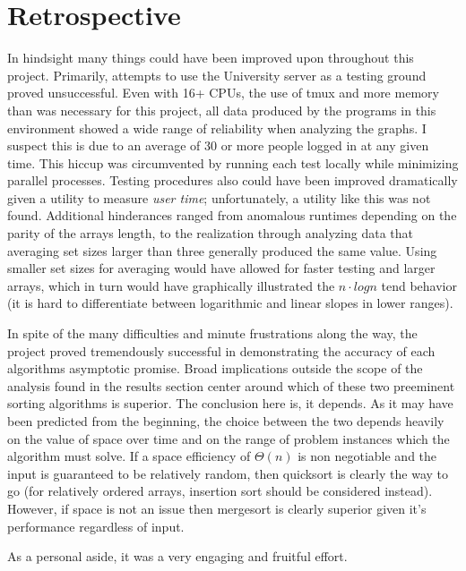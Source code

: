 \documentclass[11pt,letterpaper]{report}
\begin{document}
\section*{Retrospective} %
In hindsight many things could have been improved upon throughout this project. Primarily, attempts to use the University server as a testing ground proved unsuccessful. Even with 16+ CPUs, the use of tmux and more memory than was necessary for this project, all data produced by the programs in this environment showed a wide range of reliability when analyzing the graphs. I suspect this is due to an average of 30 or more people logged in at any given time. This hiccup was circumvented by running each test locally while minimizing parallel processes. Testing procedures also could have been improved dramatically given a utility to measure \emph{user time}; unfortunately, a utility like this was not found. Additional hinderances ranged from anomalous runtimes depending on the parity of the arrays length, to the realization through analyzing data that averaging set sizes larger than three generally produced the same value. Using smaller set sizes for averaging would have allowed for faster testing and larger arrays, which in turn would have graphically illustrated the $n \cdot log{}n$ tend behavior (it is hard to differentiate between logarithmic and linear slopes in lower ranges).

In spite of the many difficulties and minute frustrations along the way, the project proved tremendously successful in demonstrating the accuracy of each algorithms asymptotic promise. Broad implications outside the scope of the analysis found in the results section center around which of these two preeminent sorting algorithms is superior. The conclusion here is, it depends. As it may have been predicted from the beginning, the choice between the two depends heavily on the value of space over time and on the range of problem instances which the algorithm must solve. If a space efficiency of $\Theta(n)$ is non negotiable and the input is guaranteed to be relatively random, then quicksort is clearly the way to go (for relatively ordered arrays, insertion sort should be considered instead). However, if space is not an issue then mergesort is clearly superior given it's performance regardless of input. 

As a personal aside, it was a very engaging and fruitful effort. 
\end{document}
